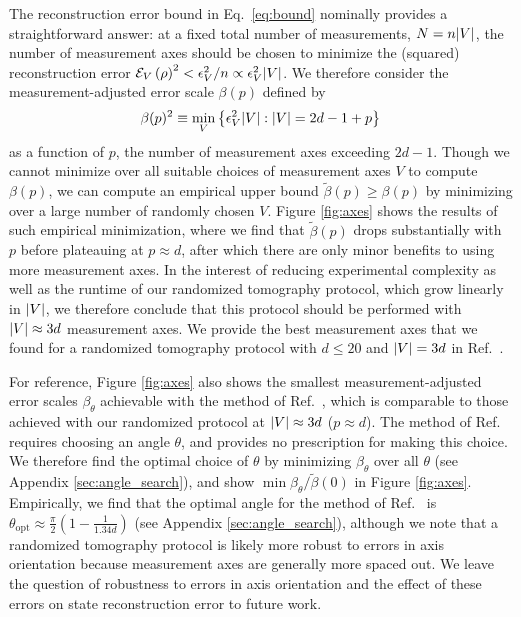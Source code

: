 \documentclass[nofootinbib,twocolumn]{revtex4-1}
\renewcommand{\t}{\text} %
\newcommand{\p}[1]{\left(#1\right)} %
\renewcommand{\Set}[1]{\left\{#1\right\}} %
\newcommand{\E}{\mathcal{E}}
\begin{document}
The reconstruction error bound in Eq.~\eqref{eq:bound} nominally provides a straightforward answer: at a fixed total number of measurements, $N=n\abs{V}$, the number of measurement axes should be chosen to minimize the (squared) reconstruction error $\E_V\p{\rho}^2<\epsilon_V^2/n\propto\epsilon_V^2\abs{V}$.
We therefore consider the measurement-adjusted error scale $\beta(p)$ defined by
\begin{align}
  \beta(p)^2
  \equiv \min_V\Set{\epsilon_V^2\abs{V}:\abs{V}=2d-1+p}
\end{align}
as a function of $p$, the number of measurement axes exceeding $2d-1$.
Though we cannot minimize over all suitable choices of measurement axes $V$ to compute $\beta(p)$, we can compute an empirical upper bound $\tilde\beta(p)\ge\beta(p)$ by minimizing over a large number of randomly chosen $V$.
Figure \ref{fig:axes} shows the results of such empirical minimization, where we find that $\tilde\beta(p)$ drops substantially with $p$ before plateauing at $p\approx d$, after which there are only minor benefits to using more measurement axes.
In the interest of reducing experimental complexity as well as the runtime of our randomized tomography protocol, which grow linearly in $\abs{V}$, we therefore conclude that this protocol should be performed with $\abs{V}\approx3d$ measurement axes.
We provide the best measurement axes that we found for a randomized tomography protocol with $d\le20$ and $\abs{V}=3d$ in Ref.~\cite{tomo_codes}.

For reference, Figure \ref{fig:axes} also shows the smallest measurement-adjusted error scales $\beta_\theta$ achievable with the method of Ref.~\cite{newton1968measurability}, which is comparable to those achieved with our randomized protocol at $\abs{V}\approx3d$ ($p\approx d$).
The method of Ref.~\cite{newton1968measurability} requires choosing an angle $\theta$, and provides no prescription for making this choice.
We therefore find the optimal choice of $\theta$ by minimizing $\beta_\theta$ over all $\theta$ (see Appendix \ref{sec:angle_search}), and show $\min\beta_\theta/\tilde\beta(0)$ in Figure \ref{fig:axes}.
Empirically, we find that the optimal angle for the method of Ref.~\cite{newton1968measurability} is $\theta_{\t{opt}}\approx\frac{\pi}{2}(1 - \frac1{1.34d})$ (see Appendix \ref{sec:angle_search}), although we note that a randomized tomography protocol is likely more robust to errors in axis orientation because measurement axes are generally more spaced out.
We leave the question of robustness to errors in axis orientation and the effect of these errors on state reconstruction error to future work.
\end{document}
